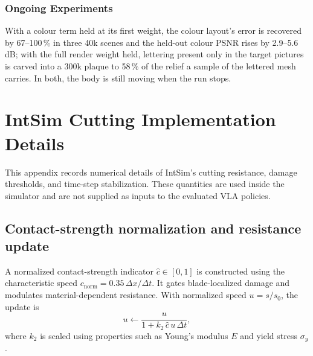 \subsection{Ongoing Experiments}
With a colour term held at its first weight, the colour layout's error is recovered by 67--100\,\% in three 40k scenes and the
held-out colour PSNR rises by 2.9--5.6\,dB; with the full render weight held, lettering present only in the target pictures is
carved into a 300k plaque to 58\,\% of the relief a sample of the lettered mesh carries. In both, the body is still moving when
the run stops.

\setlength{\emergencystretch}{0pt}

\clearpage
\chapter{IntSim Cutting Implementation Details}
\label{app:cutting-impl}

\renewcommand{\theequation}{\thechapter.\arabic{equation}}
\setcounter{equation}{0}

This appendix records numerical details of IntSim's cutting resistance, damage thresholds, and time-step stabilization. These quantities are used inside the simulator and are not supplied as inputs to the evaluated VLA policies.

\section{Contact-strength normalization and resistance update}
\label{app:cut-contact-resistance}

A normalized contact-strength indicator $\hat c\in[0,1]$ is constructed using the characteristic speed $c_{\mathrm{norm}}=0.35\,\Delta x/\Delta t$. It gates blade-localized damage and modulates material-dependent resistance. With normalized speed $u=s/s_0$, the update is
\begin{equation}\label{eq:cut_resistance}
  u\leftarrow\frac{u}{1+k_2\,\hat c\,u\,\Delta t},
\end{equation}
where $k_2$ is scaled using properties such as Young's modulus $E$ and yield stress $\sigma_y$.

